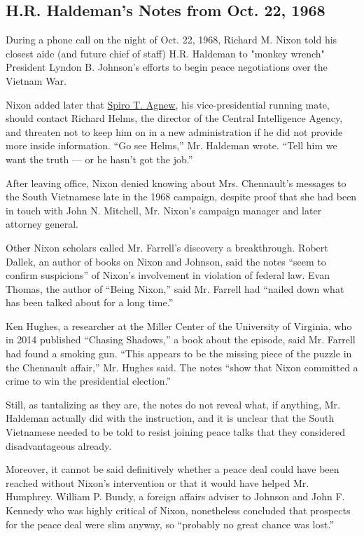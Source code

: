 \hypertarget{hr-haldemans-notes-from-oct-22-1968}{%
\subsection{H.R. Haldeman's Notes from Oct. 22,
1968}\label{hr-haldemans-notes-from-oct-22-1968}}

During a phone call on the night of Oct. 22, 1968, Richard M. Nixon told
his closest aide (and future chief of staff) H.R. Haldeman to "monkey
wrench" President Lyndon B. Johnson's efforts to begin peace
negotiations over the Vietnam War.

Nixon added later that
\href{http://topics.nytimes.com/top/reference/timestopics/people/a/spiro_t_agnew/index.html}{Spiro
T. Agnew}, his vice-presidential running mate, should contact Richard
Helms, the director of the Central Intelligence Agency, and threaten not
to keep him on in a new administration if he did not provide more inside
information. ``Go see Helms,'' Mr. Haldeman wrote. ``Tell him we want
the truth --- or he hasn't got the job.''

After leaving office, Nixon denied knowing about Mrs. Chennault's
messages to the South Vietnamese late in the 1968 campaign, despite
proof that she had been in touch with John N. Mitchell, Mr. Nixon's
campaign manager and later attorney general.

Other Nixon scholars called Mr. Farrell's discovery a breakthrough.
Robert Dallek, an author of books on Nixon and Johnson, said the notes
``seem to confirm suspicions'' of Nixon's involvement in violation of
federal law. Evan Thomas, the author of ``Being Nixon,'' said Mr.
Farrell had ``nailed down what has been talked about for a long time.''

Ken Hughes, a researcher at the Miller Center of the University of
Virginia, who in 2014 published ``Chasing Shadows,'' a book about the
episode, said Mr. Farrell had found a smoking gun. ``This appears to be
the missing piece of the puzzle in the Chennault affair,'' Mr. Hughes
said. The notes ``show that Nixon committed a crime to win the
presidential election.''

Still, as tantalizing as they are, the notes do not reveal what, if
anything, Mr. Haldeman actually did with the instruction, and it is
unclear that the South Vietnamese needed to be told to resist joining
peace talks that they considered disadvantageous already.

Moreover, it cannot be said definitively whether a peace deal could have
been reached without Nixon's intervention or that it would have helped
Mr. Humphrey. William P. Bundy, a foreign affairs adviser to Johnson and
John F. Kennedy who was highly critical of Nixon, nonetheless concluded
that prospects for the peace deal were slim anyway, so ``probably no
great chance was lost.''

